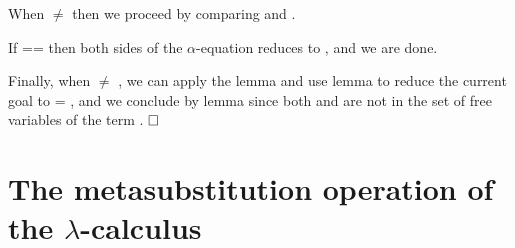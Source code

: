When  \ensuremath{\not=}  then we proceed by comparing  and .
\begin{coqdoccode}
\end{coqdoccode}
If  ==  then both sides of the $\alpha$-equation reduces to    , and we are done. 
\begin{coqdoccode}
\end{coqdoccode}
Finally, when  \ensuremath{\not=} , we can apply the lemma  and use lemma  to reduce the current goal to     = , and we conclude by lemma  since both  and  are not in the set of free variables of the term . $\hfill\Box$
\begin{coqdoccode}
\coqdocemptyline
\end{coqdoccode}
\section{The metasubstitution operation of the $\lambda$-calculus}



